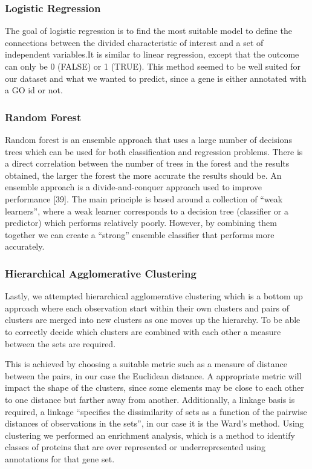 \documentclass[9pt]{article}
\begin{document}
\subsubsection{Logistic Regression}
The goal of logistic regression is to find the most suitable model to define the connections between the divided characteristic of interest and a set of independent variables.It is similar to linear regression, except that the outcome can only be 0 (FALSE) or 1 (TRUE). This method seemed to be well suited for our dataset and what we wanted to predict, since a gene is either annotated with a GO id or not.

\subsubsection{Random Forest}
Random forest is an ensemble approach that uses a large number of decisions trees which can be used for both classification and regression problems. There is a direct correlation between the number of trees in the forest and the results obtained, the larger the forest the more accurate the results should be. An ensemble approach is a divide-and-conquer approach used to improve performance [39]. The main principle is based around a collection of “weak learners”, where a weak learner corresponds to a decision tree (classifier or a predictor) which performs relatively poorly. However, by combining them together we can create a “strong” ensemble classifier that performs more accurately. 

\subsubsection{Hierarchical Agglomerative Clustering}
Lastly, we attempted hierarchical agglomerative clustering which is a bottom up approach where each observation start within their own clusters and pairs of clusters are merged into new clusters as one moves up the hierarchy. To be able to correctly decide which clusters are combined with each other a measure between the sets are required. 

This is achieved by choosing a suitable metric such as a measure of distance between the pairs, in our case the Euclidean distance. A appropriate metric will impact the shape of the clusters, since some elements may be close to each other to one distance but farther away from another. Additionally, a linkage basis is required, a linkage “specifies the dissimilarity of sets as a function of the pairwise distances of observations in the sets”, in our case it is the Ward’s method.  Using clustering we performed an enrichment analysis, which is a method to identify classes of proteins that are over represented or underrepresented using annotations for that gene set. 
\end{document}
